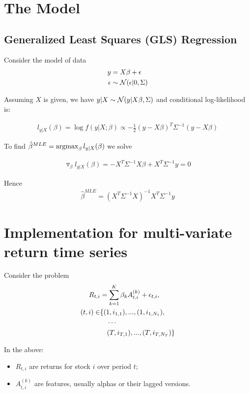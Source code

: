 \section{The Model}
\subsection{Generalized Least Squares (GLS) Regression}
Consider the model of data
\begin{align}
	y &= X \beta + \epsilon  \\
	\epsilon &\sim \mathcal{N}(\epsilon| 0, \Sigma) \nonumber
\end{align}

Assuming $X$ is given, we have $y|X \sim \mathcal{N}(y| X \beta, \Sigma)$ and conditional log-likelihood is:

\begin{align*}
	l_{y|X}(\beta) = \log f(y|X; \beta) \propto -\frac{1}{2} (y - X\beta)^T \Sigma^{-1} (y - X \beta)
\end{align*}

To find $\hat{\beta}^{MLE} = \operatorname*{argmax}_\beta  l_{y|X}(\beta)$ we solve


\begin{align*}
	\triangledown_{\beta} l_{y|X}(\beta) = - X^T \Sigma^{-1} X \beta + X^T \Sigma^{-1} y = 0
\end{align*}

Hence
\begin{align}
	\label{eq:beta_mle}
	\hat{\beta}^{MLE} = (X^T \Sigma^{-1} X)^{-1} X^T \Sigma^{-1} y
\end{align}


\section{Implementation for multi-variate return time series}
Consider the problem 
\begin{align}\label{eq:return_alpha}
	R_{t,i} &= \sum_{k=1}^K \beta_k A^{(k)}_{t,i} + \epsilon_{t,i}, \\
	(t,i) \in &\{(1, i_{1,1}),...,(1, i_{1, N_1}),\notag\\
	&\phantom{\in\ }\cdots\notag\\
	&\phantom{\in\ }(T, i_{T,1}),...,(T, i_{T, N_T})\} \notag
\end{align}

In the above:
\begin{itemize}
	\item $R_{t,i}$ are returns for stock $i$ over period $t$;
	\item $A^{(k)}_{t,i}$ are features, usually alphas or their lagged versions.
\end{itemize} 

